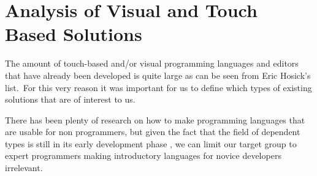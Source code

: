 \section{Analysis of Visual and Touch Based Solutions}
\label{sec:Analysis}

The amount of touch-based and/or visual programming languages and editors that have already been developed is quite large as can be seen from Eric Hosick's list.\,\cite{hosick2014} For this very reason it was important for us to define which types of existing solutions that are of interest to us.

There has been plenty of research on how to make programming languages that are usable for non programmers, but given the fact that the field of dependent types is still in its early development phase , we can limit our target group to expert programmers making introductory languages for novice developers irrelevant.



